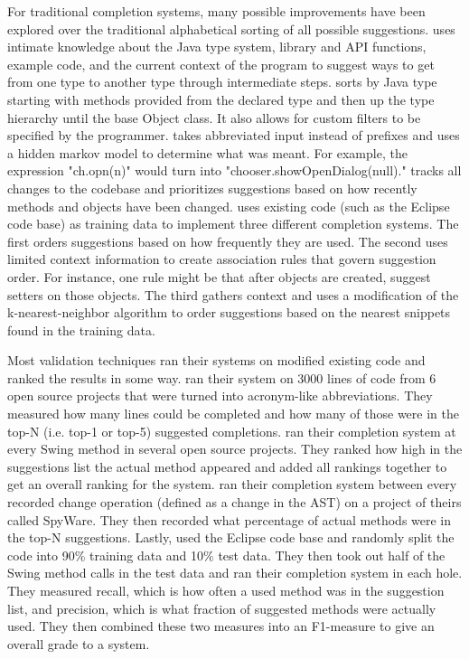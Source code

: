 \documentclass[ms,electronic,twosidetoc,letterpaper,chaptercenter,parttop,lol,lof,lot]{byumsphd}
\begin{document}
For traditional completion systems, many possible improvements have been explored over the traditional alphabetical sorting of all possible suggestions. \cite{Jungloid} uses intimate knowledge about the Java type system, library and API functions, example code, and the current context of the program to suggest ways to get from one type to another type through intermediate steps. \cite{BCC} sorts by Java type starting with methods provided from the declared type and then up the type hierarchy until the base Object class. It also allows for custom filters to be specified by the programmer. \cite{Abbreviated} takes abbreviated input instead of prefixes and uses a hidden markov model to determine what was meant. For example, the expression "ch.opn(n)" would turn into "chooser.showOpenDialog(null)." \cite{History} tracks all changes to the codebase and prioritizes suggestions based on how recently methods and objects have been changed. \cite{Examples} uses existing code (such as the Eclipse code base) as training data to implement three different completion systems. The first orders suggestions based on how frequently they are used. The second uses limited context information to create association rules that govern suggestion order. For instance, one rule might be that after objects are created, suggest setters on those objects. The third gathers context and uses a modification of the k-nearest-neighbor algorithm to order suggestions based on the nearest snippets found in the training data.

Most validation techniques ran their systems on modified existing code and ranked the results in some way. \cite{Abbreviated} ran their system on 3000 lines of code from 6 open source projects that were turned into acronym-like abbreviations. They measured how many lines could be completed and how many of those were in the top-N (i.e. top-1 or top-5) suggested completions. \cite{Towards} ran their completion system at every Swing method in several open source projects. They ranked how high in the suggestions list the actual method appeared and added all rankings together to get an overall ranking for the system. \cite{History} ran their completion system between every recorded change operation (defined as a change in the AST) on a project of theirs called SpyWare. They then recorded what percentage of actual methods were in the top-N suggestions. Lastly, \cite{Examples} used the Eclipse code base and randomly split the code into 90\% training data and 10\% test data. They then took out half of the Swing method calls in the test data and ran their completion system in each hole. They measured recall, which is how often a used method was in the suggestion list, and precision, which is what fraction of suggested methods were actually used. They then combined these two measures into an F1-measure to give an overall grade to a system.
\end{document}
